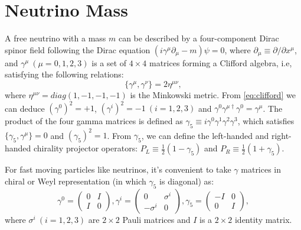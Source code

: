 \section{Neutrino Mass}\label{section:Majorana}
A free neutrino with a mass $m$ can be described by a four-component Dirac spinor field following the Dirac equation $(i\gamma^\mu\partial_\mu-m)\psi=0$, where $\partial_\mu\equiv \partial/\partial x^\mu$, and $\gamma^\mu~(\mu=0,1,2,3)$ is a set of $4\times 4$ matrices forming a Clifford algebra, i.e, satisfying the following relations\cite{akhmedov2014majorana,zee2010quantum}:
\begin{equation}\label{eq:clifford}
\{\gamma^\mu,\gamma^\nu\}=2\eta^{\mu\nu},
\end{equation}
where $\eta^{\mu\nu}=diag(1,-1,-1,-1)$ is the Minkowski metric. From \ref{eq:clifford} we can deduce $(\gamma^0)^2=+1$, $(\gamma^i)^2=-1~(i=1,2,3)$ and $\gamma^0\gamma^{\mu\dag}\gamma^0=\gamma^\mu$. The product of the four gamma matrices is defined as $\gamma_5\equiv i\gamma^0\gamma^1\gamma^2\gamma^3$, which satisfies $\{\gamma_5,\gamma^\mu\}=0$ and $(\gamma_5)^2=1$. From $\gamma_5$, we can define the left-handed and right-handed chirality projector operators: $P_L\equiv\frac{1}{2}(1-\gamma_5)$ and $P_R\equiv\frac{1}{2}(1+\gamma_5)$.

For fast moving particles like neutrinos, it's convenient to take $\gamma$ matrices in chiral or Weyl representation (in which $\gamma_5$ is diagonal) as\cite{zee2010quantum}:
\begin{equation}
\gamma^0 = \begin{pmatrix} 
0 & I \\
I & 0
\end{pmatrix},
\gamma^i = \begin{pmatrix} 
0 & \sigma^i \\
-\sigma^i & 0
\end{pmatrix},
\gamma_5 = \begin{pmatrix} 
-I & 0 \\
0 & I
\end{pmatrix},
\end{equation}
where $\sigma^i~(i=1,2,3)$ are $2\times 2$ Pauli matrices and $I$ is a $2\times 2$ identity matrix.

